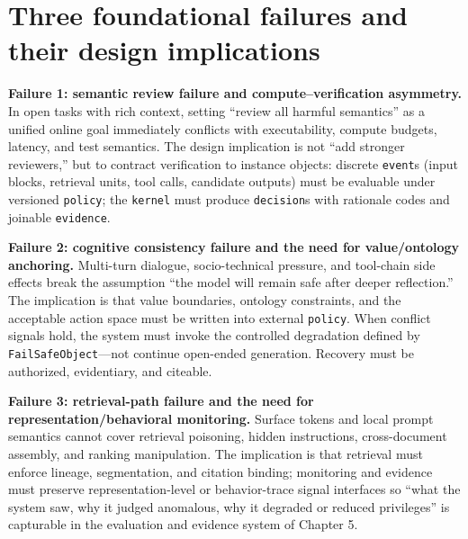 \documentclass[11pt,a4paper]{report}
\begin{document}
\section{Three foundational failures and their design implications}
\textbf{Failure 1: semantic review failure and compute–verification asymmetry.} In open tasks with rich context, setting “review all harmful semantics” as a unified online goal immediately conflicts with executability, compute budgets, latency, and test semantics. The design implication is not “add stronger reviewers,” but to contract verification to instance objects: discrete \texttt{event}s (input blocks, retrieval units, tool calls, candidate outputs) must be evaluable under versioned \texttt{policy}; the \texttt{kernel} must produce \texttt{decision}s with rationale codes and joinable \texttt{evidence}.

\textbf{Failure 2: cognitive consistency failure and the need for value/ontology anchoring.} Multi-turn dialogue, socio-technical pressure, and tool-chain side effects break the assumption “the model will remain safe after deeper reflection.” The implication is that value boundaries, ontology constraints, and the acceptable action space must be written into external \texttt{policy}. When conflict signals hold, the system must invoke the controlled degradation defined by \texttt{FailSafeObject}—not continue open-ended generation. Recovery must be authorized, evidentiary, and citeable.

\textbf{Failure 3: retrieval-path failure and the need for representation/behavioral monitoring.} Surface tokens and local prompt semantics cannot cover retrieval poisoning, hidden instructions, cross-document assembly, and ranking manipulation. The implication is that retrieval must enforce lineage, segmentation, and citation binding; monitoring and evidence must preserve representation-level or behavior-trace signal interfaces so “what the system saw, why it judged anomalous, why it degraded or reduced privileges” is capturable in the evaluation and evidence system of Chapter 5.
\end{document}
